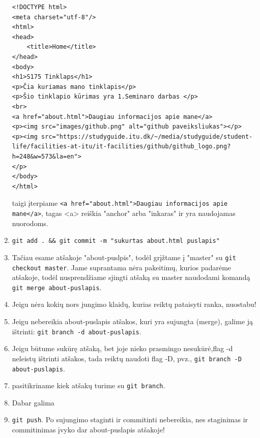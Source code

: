 \documentclass[11pt,a4paper]{article}
\begin{document}
\begin{enumerate}
\begin{lstlisting}
<!DOCTYPE html>
<meta charset="utf-8"/>
<html>
<head>
	<title>Home</title>
</head>
<body>
<h1>S175 Tinklaps</h1>
<p>Čia kuriamas mano tinklapis</p>
<p>Šio tinklapio kūrimas yra 1.Seminaro darbas </p>
<br>
<a href="about.html">Daugiau informacijos apie mane</a>
<p><img src="images/github.png" alt="github paveiksliukas"></p>
<p><img src="https://studyguide.itu.dk/~/media/studyguide/student-life/facilities-at-itu/it-facilities/github/github_logo.png?h=248&w=573&la=en">
</p>
</body>
</html>
\end{lstlisting}

taigi įterpiame \colorbox{listinggray}{\lstinline|<a href="about.html">Daugiau informacijos apie mane</a>|}, tagas <a> reiškia "anchor" arba "inkaras" ir yra  naudojamas nuorodoms. 

\item \colorbox{listinggray}{\lstinline|git add . && git commit -m "sukurtas about.html puslapis"|}  

\item Tačiau esame atšakoje "about-puslpis", todėl grįžtame į "master" su \colorbox{listinggray}{\lstinline|git checkout master|}. Jame suprantama nėra pakeitimų, kurios padarėme atšakoje, todėl nusprendžiame sjingti atšaką su master naudodami komandą
\colorbox{listinggray}{\lstinline|git merge about-puslapis|}.

\item Jeigu nėra kokių nors jungimo klaidų, kurias reiktų pataisyti ranka, nuostabu!

\item Jeigu nebereikia about-puslapis atšakos, kuri yra sujungta (merge), galime ją ištrinti: \colorbox{listinggray}{\lstinline|git branch -d about-puslapis|}. 

\item Jeigu būtume sukūrę atšaką, bet joje nieko prasmingo nesukūrė,flag -d neleistų ištrinti atšakos, tada reiktų naudoti flag -D, pvz.,  \colorbox{listinggray}{\lstinline|git branch -D about-puslapis|}. 

\item pasitikriname kiek atšakų turime su  \colorbox{listinggray}{\lstinline|git branch|}.

\item Dabar galima \item \colorbox{listinggray}{\lstinline|git push|}. Po sujungimo staginti ir commitinti nebereikia, nes staginimas ir commitinimas įvyko dar about-puslapis atšakoje!


\end{enumerate}
\end{document}
